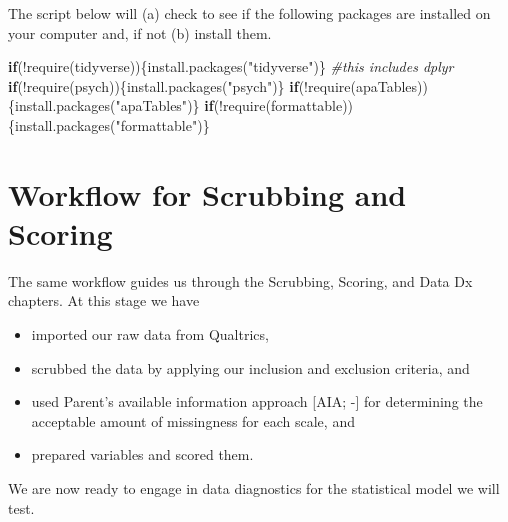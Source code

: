 \documentclass[
]{book}
\newenvironment{Shaded}{\begin{snugshade}}{\end{snugshade}}
\newcommand{\CommentTok}[1]{\textcolor[rgb]{0.56,0.35,0.01}{\textit{#1}}}
\newcommand{\ControlFlowTok}[1]{\textcolor[rgb]{0.13,0.29,0.53}{\textbf{#1}}}
\newcommand{\FunctionTok}[1]{\textcolor[rgb]{0.00,0.00,0.00}{#1}}
\newcommand{\NormalTok}[1]{#1}
\newcommand{\SpecialCharTok}[1]{\textcolor[rgb]{0.00,0.00,0.00}{#1}}
\newcommand{\StringTok}[1]{\textcolor[rgb]{0.31,0.60,0.02}{#1}}
\providecommand{\tightlist}{%
  \setlength{\itemsep}{0pt}\setlength{\parskip}{0pt}}
\begin{document}
The script below will (a) check to see if the following packages are installed on your computer and, if not (b) install them.

\begin{Shaded}
\begin{Highlighting}[]
\ControlFlowTok{if}\NormalTok{(}\SpecialCharTok{!}\FunctionTok{require}\NormalTok{(tidyverse))\{}\FunctionTok{install.packages}\NormalTok{(}\StringTok{"tidyverse"}\NormalTok{)\} }\CommentTok{\#this includes dplyr}
\ControlFlowTok{if}\NormalTok{(}\SpecialCharTok{!}\FunctionTok{require}\NormalTok{(psych))\{}\FunctionTok{install.packages}\NormalTok{(}\StringTok{"psych"}\NormalTok{)\}}
\ControlFlowTok{if}\NormalTok{(}\SpecialCharTok{!}\FunctionTok{require}\NormalTok{(apaTables))\{}\FunctionTok{install.packages}\NormalTok{(}\StringTok{"apaTables"}\NormalTok{)\}}
\ControlFlowTok{if}\NormalTok{(}\SpecialCharTok{!}\FunctionTok{require}\NormalTok{(formattable))\{}\FunctionTok{install.packages}\NormalTok{(}\StringTok{"formattable"}\NormalTok{)\}}
\end{Highlighting}
\end{Shaded}

\hypertarget{workflow-for-scrubbing-and-scoring-2}{%
\section{Workflow for Scrubbing and Scoring}\label{workflow-for-scrubbing-and-scoring-2}}

The same workflow guides us through the Scrubbing, Scoring, and Data Dx chapters. At this stage we have

\begin{itemize}
\tightlist
\item
  imported our raw data from Qualtrics,
\item
  scrubbed the data by applying our inclusion and exclusion criteria, and
\item
  used Parent's available information approach {[}AIA; -\citet{parent_handling_2013}{]} for determining the acceptable amount of missingness for each scale, and
\item
  prepared variables and scored them.
\end{itemize}

We are now ready to engage in data diagnostics for the statistical model we will test.
\end{document}
